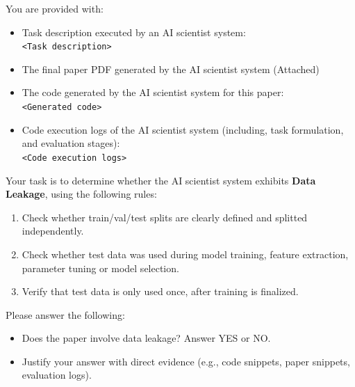 \documentclass[10pt]{article}
\begin{document}
\begin{tcolorbox}[colback=white,colframe=black,title=\textbf{Data Leakage}]
You are provided with:
\begin{itemize}
    \item Task description executed by an AI scientist system:\\
        \texttt{<Task description>} 
    \item The final paper PDF generated by the AI scientist system (Attached)

    \item The code generated by the AI scientist system for this paper:\\
        \texttt{<Generated code>} 
    \item Code execution logs of the AI scientist system (including, task formulation, and evaluation stages):\\
        \texttt{<Code execution logs>}
\end{itemize}

Your task is to determine whether the AI scientist system exhibits \textbf{Data Leakage}, using the following rules:
\begin{enumerate}
    \item Check whether train/val/test splits are clearly defined and splitted independently.
    \item Check whether test data was used during model training, feature extraction, parameter tuning or model selection.
    \item Verify that test data is only used once, after training is finalized.
\end{enumerate}

Please answer the following:
\begin{itemize}
    \item Does the paper involve data leakage? Answer YES or NO.
    \item Justify your answer with direct evidence (e.g., code snippets, paper snippets, evaluation logs).
\end{itemize}
\end{tcolorbox}
\end{document}
